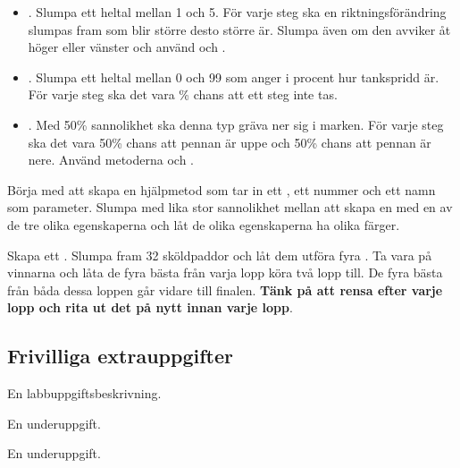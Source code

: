 \begin{itemize}

\item {}. Slumpa ett heltal  mellan 1 och 5. För varje steg ska en riktningsförändring slumpas fram som blir större desto större  är. Slumpa även om den avviker åt höger eller vänster och använd  och .

\item {}. Slumpa ett heltal  mellan 0 och 99 som anger i procent hur tankspridd  är. För varje steg ska det vara \% chans att ett steg inte tas.

\item {}. Med 50\% sannolikhet ska denna typ  gräva ner sig i marken. För varje steg ska det vara 50\% chans att pennan är uppe och 50\% chans att pennan är nere. Använd metoderna  och .

\end{itemize}

\Task {}

\Subtask Börja med att skapa en hjälpmetod  som tar in ett , ett nummer och ett namn som parameter. Slumpa med lika stor sannolikhet mellan att skapa en  med en av de tre olika egenskaperna och låt de olika egenskaperna ha olika färger.

\Subtask Skapa ett . Slumpa fram 32 sköldpaddor och låt dem utföra fyra . Ta vara på vinnarna och låta de fyra bästa från varja lopp köra två lopp till. De fyra bästa från båda dessa loppen går vidare till finalen. \textbf{Tänk på att rensa  efter varje lopp och rita ut det på nytt innan varje lopp}.

\subsection{Frivilliga extrauppgifter}

\Task En labbuppgiftsbeskrivning.

\Subtask En underuppgift.

\Subtask En underuppgift.
